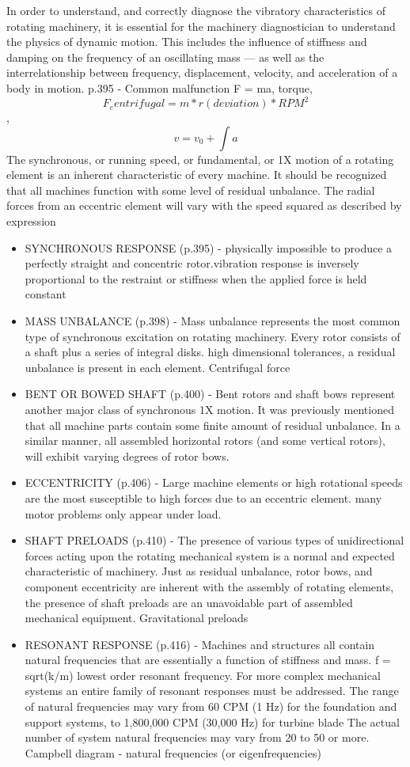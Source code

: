 In order to understand, and correctly diagnose the vibratory characteristics of rotating machinery, it is essential for the machinery diagnostician to understand the physics of dynamic motion. This includes the influence of stiffness and damping on the frequency of an oscillating mass — as well as the interrelationship between frequency, displacement, velocity, and acceleration of a body in motion.
p.395 - Common malfunction   F = ma, torque, $$F_centrifugal = m * r(deviation) * RPM^2$$, $$v = v_0 + \int a$$
The synchronous, or running speed, or fundamental, or 1X motion of a rotating element is an inherent characteristic of every machine. It should be recognized that all machines function with some level of residual unbalance. The radial forces from an eccentric element will vary with the speed squared as described by expression
\begin{itemize}
\item SYNCHRONOUS RESPONSE (p.395) - physically impossible to produce a perfectly straight and concentric rotor.vibration response is inversely proportional to the restraint or stiffness when the applied force is held constant
\item MASS UNBALANCE (p.398) - Mass unbalance represents the most common type of synchronous excitation on rotating machinery. Every rotor consists of a shaft plus a series of integral disks. high dimensional tolerances, a residual unbalance is present in each element. Centrifugal force
\item BENT OR BOWED SHAFT (p.400) - Bent rotors and shaft bows represent another major class of synchronous 1X motion. It was previously mentioned that all machine parts contain some finite amount of residual unbalance. In a similar manner, all assembled horizontal rotors (and some vertical rotors), will exhibit varying degrees of rotor bows.
\item ECCENTRICITY  (p.406) - Large machine elements or high rotational speeds are the most susceptible to high forces due to an eccentric element. many motor problems only appear under load.
\item SHAFT PRELOADS (p.410) - The presence of various types of unidirectional forces acting upon the rotating mechanical system is a normal and expected characteristic of machinery. Just as residual unbalance, rotor bows, and component eccentricity are inherent with the assembly of rotating elements, the presence of shaft preloads are an unavoidable part of assembled mechanical equipment. Gravitational preloads
\item RESONANT RESPONSE (p.416) - Machines and structures all contain natural frequencies that are essentially a function of stiffness and mass. f = sqrt(k/m) lowest order resonant frequency. For more complex mechanical systems an entire family of resonant responses must be addressed. The range of natural frequencies may vary from 60 CPM (1 Hz) for the foundation and support systems, to 1,800,000 CPM (30,000 Hz) for turbine blade The actual number of system natural frequencies may vary from 20 to 50 or more. Campbell diagram  -  natural frequencies (or eigenfrequencies)


\end{itemize}
